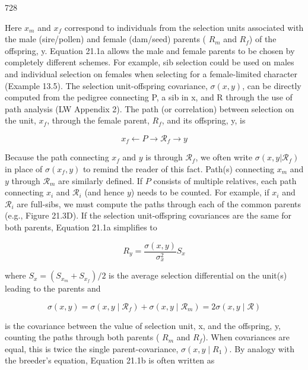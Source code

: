 \documentclass{article}
\begin{document}
728

Here  $ x_{m} $ and  $ x_{f} $ correspond to individuals from the selection units associated with the male (sire/pollen) and female (dam/seed) parents ( $ R_{m} $ and  $ R_{f} $) of the offspring, y. Equation 21.1a allows the male and female parents to be chosen by completely different schemes. For example, sib selection could be used on males and individual selection on females when selecting for a female-limited character (Example 13.5). The selection unit-offspring covariance,  $ \sigma(x,y) $, can be directly computed from the pedigree connecting P, a sib in x, and R through the use of path analysis (LW Appendix 2). The path (or correlation) between selection on the unit,  $ x_{f} $, through the female parent,  $ R_{f} $, and its offspring, y, is

\begin{equation}
x_{f}\leftarrow P\rightarrow\mathcal{R}_{f}\rightarrow y
\end{equation}

Because the path connecting  $ x_f $ and  $ y $ is through  $ \mathcal{R}_f $, we often write  $ \sigma(x,y|\mathcal{R}_f) $ in place of  $ \sigma(x_f,y) $ to remind the reader of this fact. Path(s) connecting  $ x_m $ and  $ y $ through  $ \mathcal{R}_m $ are similarly defined. If  $ P $ consists of multiple relatives, each path connecting  $ x_i $ and  $ \mathcal{R}_i $ (and hence  $ y $) needs to be counted. For example, if  $ x_i $ and  $ \mathcal{R}_i $ are full-sibs, we must compute the paths through each of the common parents (e.g., Figure 21.3D). If the selection unit-offspring covariances are the same for both parents, Equation 21.1a simplifies to

\begin{equation}
R_{y}=\frac{\sigma(x,y)}{\sigma_{x}^{2}}S_{x}
\tag{21.1b}
\label{eq:21_1b}
\end{equation}

where  $ S_{x} = (S_{x_{m}} + S_{x_{f}})/2 $ is the average selection differential on the unit(s) leading to the parents and

\begin{equation}
\sigma(x,y)=\sigma(x,y\mid\mathcal{R}_{f})+\sigma(x,y\mid\mathcal{R}_{m})=2\sigma(x,y\mid\mathcal{R})
\tag{21.1c}
\label{eq:21_1c}
\end{equation}

is the covariance between the value of selection unit, x, and the offspring, y, counting the paths through both parents ( $ R_{m} $ and  $ R_{f} $). When covariances are equal, this is twice the single parent-covariance,  $ \sigma(x, y \mid R_{1}) $. By analogy with the breeder's equation, Equation 21.1b is often written as
\end{document}
